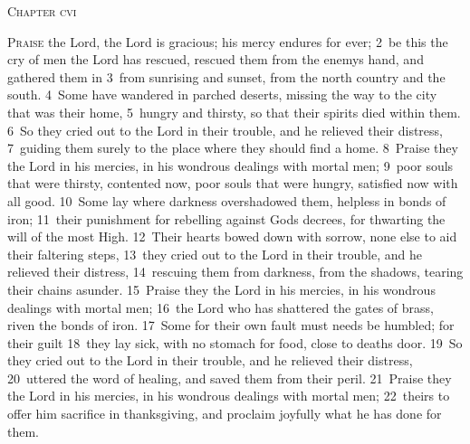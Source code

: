 \documentclass[10pt]{book} %
\begin{document}
\begin{large}\begin{center}\textsc{Chapter cvi}\end{center}\end{large}
\lettrine[lines=2]{P}{raise} the Lord, the Lord is gracious; his mercy endures for ever; \textcolor{benred8}{2}~be this the cry of men the Lord has rescued, rescued them from the enemy\textquotesingle s hand, and gathered them in \textcolor{benred8}{3}~from sunrising and sunset, from the north country and the south.
\textcolor{benred8}{4}~Some have wandered in parched deserts, missing the way to the city that was their home, \textcolor{benred8}{5}~hungry and thirsty, so that their spirits died within them. \textcolor{benred8}{6}~So they cried out to the Lord in their trouble, and he relieved their distress, \textcolor{benred8}{7}~guiding them surely to the place where they should find a home. \textcolor{benred8}{8}~Praise they the Lord in his mercies, in his wondrous dealings with mortal men; \textcolor{benred8}{9}~poor souls that were thirsty, contented now, poor souls that were hungry, satisfied now with all good.
\textcolor{benred8}{10}~Some lay where darkness overshadowed them, helpless in bonds of iron; \textcolor{benred8}{11}~their punishment for rebelling against God\textquotesingle s decrees, for thwarting the will of the most High. \textcolor{benred8}{12}~Their hearts bowed down with sorrow, none else to aid their faltering steps, \textcolor{benred8}{13}~they cried out to the Lord in their trouble, and he relieved their distress, \textcolor{benred8}{14}~rescuing them from darkness, from the shadows, tearing their chains asunder. \textcolor{benred8}{15}~Praise they the Lord in his mercies, in his wondrous dealings with mortal men; \textcolor{benred8}{16}~the Lord who has shattered the gates of brass, riven the bonds of iron.
\textcolor{benred8}{17}~Some for their own fault must needs be humbled; for their guilt \textcolor{benred8}{18}~they lay sick, with no stomach for food, close to death\textquotesingle s door. \textcolor{benred8}{19}~So they cried out to the Lord in their trouble, and he relieved their distress, \textcolor{benred8}{20}~uttered the word of healing, and saved them from their peril. \textcolor{benred8}{21}~Praise they the Lord in his mercies, in his wondrous dealings with mortal men; \textcolor{benred8}{22}~theirs to offer him sacrifice in thanksgiving, and proclaim joyfully what he has done for them.
\end{document}
